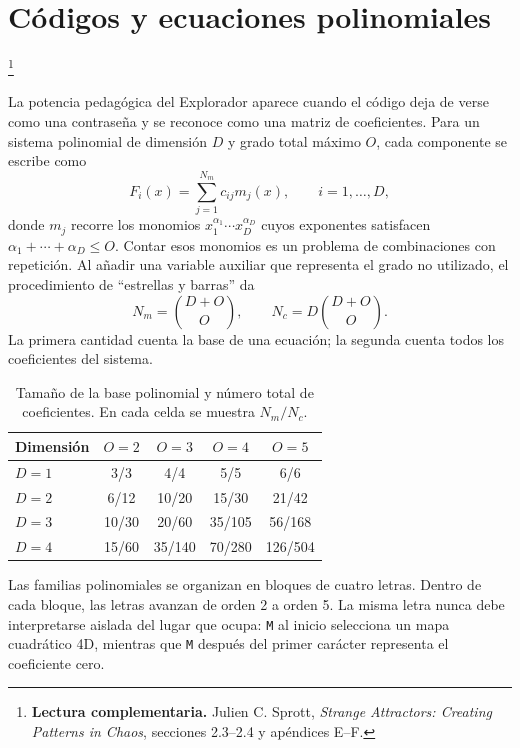 \documentclass[11pt]{article}
\newcommand{\codigo}[1]{\texttt{#1}}
\newcommand{\lecturasprott}[1]{%
  \par\noindent{\sffamily\scriptsize\color{Teal}Lectura complementaria}\footnote{%
  \textbf{Lectura complementaria.} #1}\par}
\begin{document}
\section{Códigos y ecuaciones polinomiales}
\lecturasprott{Julien C. Sprott, \emph{Strange Attractors: Creating Patterns in Chaos}, secciones 2.3--2.4 y apéndices E--F.}

La potencia pedagógica del Explorador aparece cuando el código deja de verse como una
contraseña y se reconoce como una matriz de coeficientes. Para un sistema polinomial de
dimensión \(D\) y grado total máximo \(O\), cada componente se escribe como
\[
 F_i(x)=\sum_{j=1}^{N_m}c_{ij}m_j(x),\qquad i=1,\ldots,D,
\]
donde \(m_j\) recorre los monomios
\(x_1^{\alpha_1}\cdots x_D^{\alpha_D}\) cuyos exponentes satisfacen
\(\alpha_1+\cdots+\alpha_D\leq O\). Contar esos monomios es un problema de
combinaciones con repetición. Al añadir una variable auxiliar que representa el grado
no utilizado, el procedimiento de ``estrellas y barras'' da
\[
 N_m=\binom{D+O}{O},\qquad
 N_c=D\binom{D+O}{O}.
\]
La primera cantidad cuenta la base de una ecuación; la segunda cuenta todos los
coeficientes del sistema.

\begin{table}[H]
\centering
\caption{Tamaño de la base polinomial y número total de coeficientes. En cada celda se
muestra \(N_m/N_c\).}
\small
\begin{tabularx}{0.88\textwidth}{>{\sffamily}lCCCC}
\toprule
{}
\color{white}Dimensión & \color{white}\(O=2\) & \color{white}\(O=3\) &
\color{white}\(O=4\) & \color{white}\(O=5\)\\
\midrule
\(D=1\) & 3/3 & 4/4 & 5/5 & 6/6\\
\(D=2\) & 6/12 & 10/20 & 15/30 & 21/42\\
\(D=3\) & 10/30 & 20/60 & 35/105 & 56/168\\
\(D=4\) & 15/60 & 35/140 & 70/280 & 126/504\\
\bottomrule
\end{tabularx}
\end{table}

Las familias polinomiales se organizan en bloques de cuatro letras. Dentro de cada
bloque, las letras avanzan de orden 2 a orden 5. La misma letra nunca debe interpretarse
aislada del lugar que ocupa: \codigo{M} al inicio selecciona un mapa cuadrático 4D,
mientras que \codigo{M} después del primer carácter representa el coeficiente cero.
\end{document}
